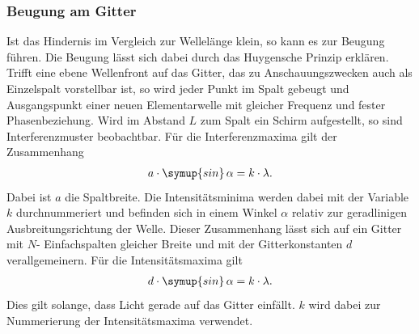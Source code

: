 \subsubsection{Beugung am Gitter}
\label{sec:Gitter1}
Ist das Hindernis im Vergleich zur Wellelänge klein, so kann es zur Beugung führen. Die Beugung lässt sich dabei durch das Huygensche
Prinzip erklären.\\
Trifft eine ebene Wellenfront auf das Gitter, das zu Anschauungszwecken auch als Einzelspalt vorstellbar ist, so wird jeder Punkt im
Spalt gebeugt und Ausgangspunkt einer neuen Elementarwelle mit gleicher Frequenz und fester Phasenbeziehung. Wird im Abstand $L$ zum Spalt
ein Schirm aufgestellt, so sind Interferenzmuster beobachtbar. Für die Interferenzmaxima gilt der Zusammenhang
\begin{align}
    \label{eqn:minima}
    a\cdot\symup{sin}\,\alpha = k\cdot\lambda.
\end{align}
Dabei ist $a$ die Spaltbreite. Die Intensitätsminima werden dabei mit der Variable $k$ durchnummeriert und befinden sich in einem
Winkel $\alpha$ relativ zur geradlinigen Ausbreitungsrichtung der Welle. Dieser Zusammenhang lässt sich auf ein Gitter mit $N$-
Einfachspalten gleicher Breite und mit der Gitterkonstanten $d$ verallgemeinern. Für die Intensitätsmaxima gilt
\begin{align}
    d\cdot\symup{sin}\,\alpha = k\cdot\lambda.
\end{align}
Dies gilt solange, dass Licht gerade auf das Gitter einfällt. $k$ wird dabei zur Nummerierung der Intensitätsmaxima verwendet.
